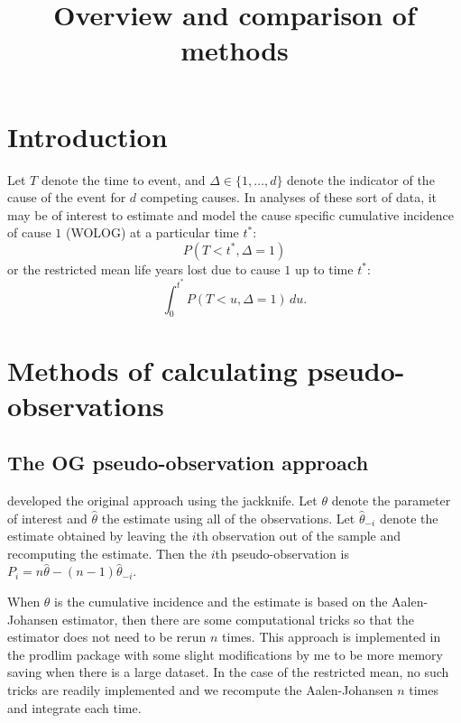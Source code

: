\documentclass[
]{article}
\title{Overview and comparison of methods}
\author{}
\date{\vspace{-2.5em}}
\begin{document}
\maketitle

\hypertarget{introduction}{%
\section{Introduction}\label{introduction}}

Let \(T\) denote the time to event, and \(\Delta \in \{1, \ldots, d\}\)
denote the indicator of the cause of the event for \(d\) competing
causes. In analyses of these sort of data, it may be of interest to
estimate and model the cause specific cumulative incidence of cause
\(1\) (WOLOG) at a particular time \(t^*\): \[
P(T < t^*, \Delta = 1)
\] or the restricted mean life years lost due to cause \(1\) up to time
\(t^*\): \[
\int_0^{t^*} P(T < u, \Delta = 1) \, du.
\]

\citet{andersen_cause-specific_2013}

\hypertarget{methods-of-calculating-pseudo-observations}{%
\section{Methods of calculating
pseudo-observations}\label{methods-of-calculating-pseudo-observations}}

\hypertarget{the-og-pseudo-observation-approach}{%
\subsection{The OG pseudo-observation
approach}\label{the-og-pseudo-observation-approach}}

\citet{andersen_generalised_2003} developed the original approach using
the jackknife. Let \(\theta\) denote the parameter of interest and
\(\hat{\theta}\) the estimate using all of the observations. Let
\(\hat{\theta}_{-i}\) denote the estimate obtained by leaving the
\(i\)th observation out of the sample and recomputing the estimate. Then
the \(i\)th pseudo-observation is
\(P_i = n \hat{\theta} - (n - 1) \hat{\theta}_{-i}\).

When \(\theta\) is the cumulative incidence and the estimate is based on
the Aalen-Johansen estimator, then there are some computational tricks
so that the estimator does not need to be rerun \(n\) times. This
approach is implemented in the prodlim package \citep{prodlim} with some
slight modifications by me to be more memory saving when there is a
large dataset. In the case of the restricted mean, no such tricks are
readily implemented and we recompute the Aalen-Johansen \(n\) times and
integrate each time.
\end{document}
